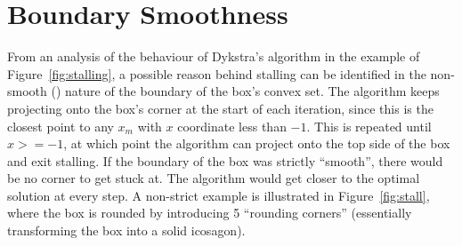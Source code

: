 \documentclass[hidelinks]{article}
\begin{document}
\section{Boundary Smoothness}
From an analysis of the behaviour of Dykstra's algorithm in the example of Figure~\ref{fig:stalling}, a possible reason behind stalling can be identified in the non-smooth (\cite{SMOOTHNESS}) nature of the boundary of the box's convex set. The algorithm keeps projecting onto the box's corner at the start of each iteration, since this is the closest point to any $x_m$ with $x$ coordinate less than $-1$. This is repeated until $x >= -1$, at which point the algorithm can project onto the top side of the box and exit stalling.
If the boundary of the box was strictly ``smooth'', there would be no corner to get stuck at. The algorithm would get closer to the optimal solution at every step. A non-strict example is illustrated in Figure~\ref{fig:stall}, where the box is rounded by introducing 5 ``rounding corners'' (essentially transforming the box into a solid icosagon).
%
\end{document}
